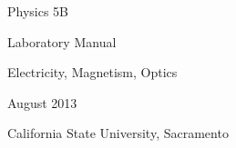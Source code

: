 
\begin{fullwidth}
\thispagestyle{empty}		%
\vspace*	{2in}
\begin{center}
	\HUGE\textsf{Physics 5B}\par
\end{center}
\begin{center}
	\LARGE\textsf{Laboratory Manual}\par
\end{center}
\begin{center}
	\HUGE\textsf{Electricity, Magnetism, Optics}\par
\end{center}
\begin{center}
	\Huge\textsf{August 2013}\par
\end{center}
\vfill
\begin{center}
\LARGE\textsf{California State University, Sacramento}\par
\end{center}
 
\vspace*{\fill}

\end{fullwidth}
\clearpage